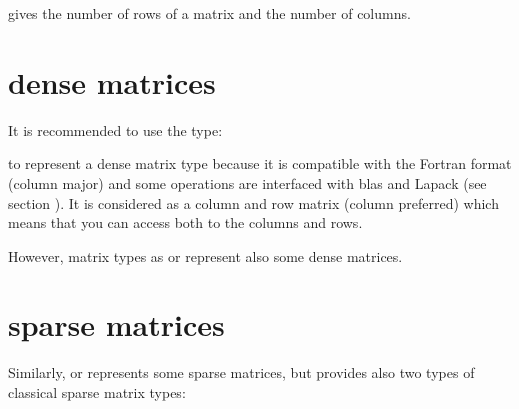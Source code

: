 \documentclass[a4paper,11pt,english]{sphinxmanual}
\begin{document}
 gives the number of rows of a matrix and  the number of columns.


\section{dense matrices}
\label{\detokenize{gmm/matrix:dense-matrices}}
It is recommended to use the type:

\begin{sphinxVerbatim}[commandchars=\\\{\}]
\end{sphinxVerbatim}

to represent a dense matrix type because it is compatible with the Fortran format (column major) and some operations are interfaced with blas and Lapack (see section  {\hyperref[\detokenize{gmm/blas_interface:gmm-lapack}]{}}). It is considered as a column and row matrix (column preferred) which means that you can access both to the columns and rows.

However, matrix types as  or  represent also some dense matrices.


\section{sparse matrices}
\label{\detokenize{gmm/matrix:sparse-matrices}}
Similarly,  or  represents some sparse matrices, but  provides also two types of classical sparse matrix types:

\begin{sphinxVerbatim}[commandchars=\\\{\}]
\end{sphinxVerbatim}
\end{document}
